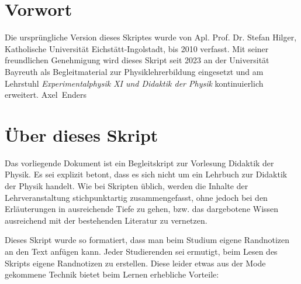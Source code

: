 \documentclass[11pt,a4paper]{book}
\begin{document}
\vs{3cm}
\section*{Vorwort}

Die urspr\"ungliche Version dieses Skriptes wurde von Apl. Prof. Dr. Stefan Hilger, Katholische Universit\"{a}t Eichst\"{a}tt-Ingolstadt, bis 2010 verfasst. Mit seiner freundlichen Genehmigung wird dieses Skript seit 2023 an der Universit\"{a}t Bayreuth als Begleitmaterial zur Physiklehrerbildung eingesetzt und am Lehrstuhl \emph{Experimentalphysik XI und Didaktik der Physik} kontinuierlich erweitert.   
\bip
\hs{10cm} Axel\ Enders


\newpage
\section*{Über dieses Skript}

Das vorliegende Dokument ist ein Begleitskript zur Vorlesung {\glqq}Didaktik der Physik{\grqq}. Es sei explizit betont, dass es sich nicht um ein Lehrbuch zur Didaktik der Physik handelt. Wie bei Skripten \"{u}blich, werden die Inhalte der Lehrveranstaltung stichpunktartig zusammengefasst, ohne jedoch bei den Erl\"{a}uterungen in ausreichende Tiefe zu gehen, bzw. das dargebotene Wissen ausreichend mit der bestehenden Literatur zu vernetzen. 

\mip

Dieses Skript wurde so formatiert, dass man beim Studium eigene Randnotizen an den Text anf\"{u}gen kann. Jeder Studierenden sei ermutigt, beim Lesen des Skripts eigene Randnotizen zu erstellen. Diese leider etwas aus der Mode gekommene Technik bietet beim Lernen erhebliche Vorteile:
\end{document}
